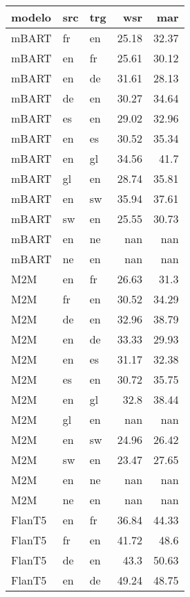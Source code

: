 \begin{tabular}{lllrr}
\hline
 modelo   & src   & trg   &    wsr &    mar \\
\hline
 mBART    & fr    & en    &  25.18 &  32.37 \\
 mBART    & en    & fr    &  25.61 &  30.12 \\
 mBART    & en    & de    &  31.61 &  28.13 \\
 mBART    & de    & en    &  30.27 &  34.64 \\
 mBART    & es    & en    &  29.02 &  32.96 \\
 mBART    & en    & es    &  30.52 &  35.34 \\
 mBART    & en    & gl    &  34.56 &  41.7  \\
 mBART    & gl    & en    &  28.74 &  35.81 \\
 mBART    & en    & sw    &  35.94 &  37.61 \\
 mBART    & sw    & en    &  25.55 &  30.73 \\
 mBART    & en    & ne    & nan    & nan    \\
 mBART    & ne    & en    & nan    & nan    \\
 M2M      & en    & fr    &  26.63 &  31.3  \\
 M2M      & fr    & en    &  30.52 &  34.29 \\
 M2M      & de    & en    &  32.96 &  38.79 \\
 M2M      & en    & de    &  33.33 &  29.93 \\
 M2M      & en    & es    &  31.17 &  32.38 \\
 M2M      & es    & en    &  30.72 &  35.75 \\
 M2M      & en    & gl    &  32.8  &  38.44 \\
 M2M      & gl    & en    & nan    & nan    \\
 M2M      & en    & sw    &  24.96 &  26.42 \\
 M2M      & sw    & en    &  23.47 &  27.65 \\
 M2M      & en    & ne    & nan    & nan    \\
 M2M      & ne    & en    & nan    & nan    \\
 FlanT5   & en    & fr    &  36.84 &  44.33 \\
 FlanT5   & fr    & en    &  41.72 &  48.6  \\
 FlanT5   & de    & en    &  43.3  &  50.63 \\
 FlanT5   & en    & de    &  49.24 &  48.75 \\

\end{tabular}
